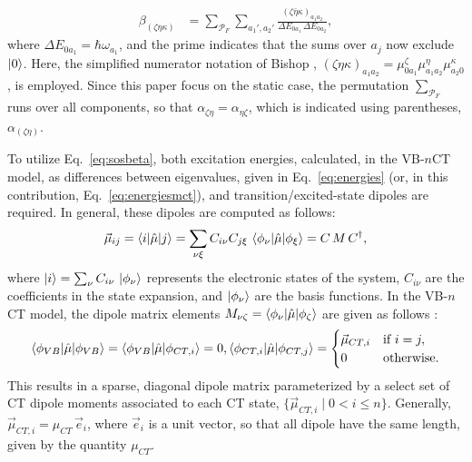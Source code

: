 \documentclass[journal=jpcafh]{achemso}
\begin{document}
\begin{align}
	\beta_{(\zeta\eta\kappa)} &=\sum_{\mathcal{P}_F} \sum_{a_1', a_2'} \frac{(\zeta\bar{\eta}\kappa)_{a_1 a_2}}{\Delta E_{0a_1}\,\Delta E_{0a_2}}, \label{eq:sosbeta}
\end{align}
where $\Delta E_{0a_1} = \hbar\omega_{a_1}$, and the prime indicates that the sums over $a_j$ now exclude $\ket{0}$.  Here, the simplified numerator notation of Bishop \cite{bishopExplicitNondivergentFormulas1994}, $(\zeta\eta\kappa)_{a_1 a_2} = \mu_{0 a_1}^\zeta \mu_{a_1 a_2}^\eta \mu_{a_2 0}^\kappa$, is employed. Since this paper focus on the static case, the permutation $\sum_{\mathcal P_F}$ runs over all components, so that $\alpha_{\zeta\eta} = \alpha_{\eta\zeta}$, which is indicated using parentheses, $\alpha_{(\zeta\eta)}$.

To utilize Eq.~\eqref{eq:sosbeta}, both excitation energies, calculated, in the VB-$n$CT model, as differences between eigenvalues, given in Eq.~\eqref{eq:energies} (or, in this contribution, Eq.~\eqref{eq:energiesmct}), and transition/excited-state dipoles are required. In general, these dipoles are computed as follows:
\begin{equation}
\vec{\mu}_{ij} = \braket{i | \hat{\mu} | j} = \sum_{\nu\xi} C_{i \nu} C_{j \xi} \, \braket{\phi_\nu | \hat{\mu} | \phi_\xi} = C\,M\,C^\dagger,
\end{equation}
where $\ket{i} = \sum_\nu C_{i \nu} \, \ket{\phi_\nu}$ represents the electronic states of the system, $C_{i \nu}$ are the coefficients in the state expansion, and $\ket{\phi_\nu}$ are the basis functions. 
In the VB-$n$CT model, the dipole matrix elements $M_{\nu\zeta} = \braket{\phi_\nu | \hat{\mu} | \phi_\zeta}$ are given as follows \cite{luValenceBondChargeTransferModel1994}:
\begin{align}
\braket{\phi_{VB} | \hat{\mu} | \phi_{VB}} = \braket{\phi_{VB} | \hat{\mu} | \phi_{CT,i}} = 0,
\braket{\phi_{CT,i} | \hat{\mu} | \phi_{CT,j}} = 
\begin{cases}
	\vec{\mu}_{CT,i} & \text{if } i = j, \\
	0 & \text{otherwise}.
\end{cases}
\end{align}
This results in a sparse, diagonal dipole matrix parameterized by a select set of CT dipole moments associated to each CT state, $\{\vec{\mu}_{CT,i} \mid 0 < i \leq n\}$. Generally, $\vec\mu_{CT, i} = \mu_{CT}\,\vec{e}_i$, where $\vec  e_i$ is a unit vector, so that all dipole have the same length, given by the quantity $\mu_{CT}$.  
\end{document}

